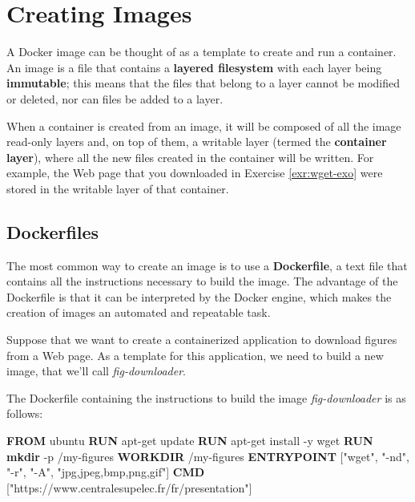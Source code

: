 \documentclass[
]{article}
\newenvironment{Shaded}{\begin{snugshade}}{\end{snugshade}}
\newcommand{\AttributeTok}[1]{\textcolor[rgb]{0.13,0.29,0.53}{#1}}
\newcommand{\ExtensionTok}[1]{#1}
\newcommand{\FunctionTok}[1]{\textcolor[rgb]{0.13,0.29,0.53}{\textbf{#1}}}
\newcommand{\KeywordTok}[1]{\textcolor[rgb]{0.13,0.29,0.53}{\textbf{#1}}}
\newcommand{\NormalTok}[1]{#1}
\newcommand{\StringTok}[1]{\textcolor[rgb]{0.31,0.60,0.02}{#1}}
\theoremstyle{definition}
\theoremstyle{definition}
\theoremstyle{definition}
\theoremstyle{remark}
\begin{document}
\section{Creating Images}\label{creating-images}

A Docker image can be thought of as a template to create and run a container.
An image is a file that contains a \textbf{layered filesystem} with each layer being \textbf{immutable};
this means that the files that belong to a layer cannot be
modified or deleted, nor can files be added to a layer.

When a container is created from an image, it
will be composed of all the image read-only layers and, on top of
them, a writable layer (termed the \textbf{container layer}),
where all the new files created in the container will be written.
For example, the Web page that you downloaded in Exercise \ref{exr:wget-exo}
were stored in the writable layer of that container.

\subsection{Dockerfiles}\label{dockerfiles}

The most common way to create an image is to use a \textbf{Dockerfile}, a
text file that contains all the instructions necessary to
build the image.
The advantage of the Dockerfile is that it can be interpreted
by the Docker engine, which makes the creation of images an automated
and repeatable task.

Suppose that we want to create a containerized
application to download figures from a Web page.
As a template for this application, we need to build a new
image, that we'll call \emph{fig-downloader}.

The Dockerfile containing the instructions to build the image
\emph{fig-downloader} is as follows:

\begin{Shaded}
\begin{Highlighting}[]
\KeywordTok{FROM}\NormalTok{ ubuntu}
\KeywordTok{RUN} \ExtensionTok{apt{-}get}\NormalTok{ update}
\KeywordTok{RUN} \ExtensionTok{apt{-}get}\NormalTok{ install }\AttributeTok{{-}y}\NormalTok{ wget}
\KeywordTok{RUN} \FunctionTok{mkdir} \AttributeTok{{-}p}\NormalTok{ /my{-}figures}
\KeywordTok{WORKDIR}\NormalTok{ /my{-}figures}
\KeywordTok{ENTRYPOINT}\NormalTok{ [}\StringTok{"wget"}\NormalTok{, }\StringTok{"{-}nd"}\NormalTok{, }\StringTok{"{-}r"}\NormalTok{, }\StringTok{"{-}A"}\NormalTok{, }\StringTok{"jpg,jpeg,bmp,png,gif"}\NormalTok{]}
\KeywordTok{CMD}\NormalTok{ [}\StringTok{"https://www.centralesupelec.fr/fr/presentation"}\NormalTok{]}
\end{Highlighting}
\end{Shaded}
\end{document}
